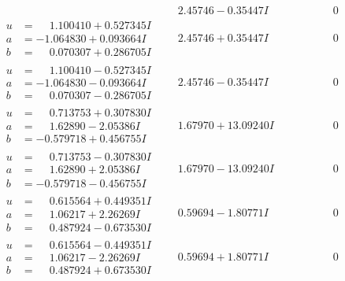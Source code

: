 \documentclass[1p]{elsarticle_modified}
\theoremstyle{definition}
\begin{document}
$$\begin{array}{c|c|c}
 & \phantom{-}2.45746 - 0.35447 I & \phantom{-0.000000 } 0 \\ \hline\begin{aligned}
u &= \phantom{-}1.100410 + 0.527345 I \\
a &= -1.064830 + 0.093664 I \\
b &= \phantom{-}0.070307 + 0.286705 I\end{aligned}
 & \phantom{-}2.45746 + 0.35447 I & \phantom{-0.000000 } 0 \\ \hline\begin{aligned}
u &= \phantom{-}1.100410 - 0.527345 I \\
a &= -1.064830 - 0.093664 I \\
b &= \phantom{-}0.070307 - 0.286705 I\end{aligned}
 & \phantom{-}2.45746 - 0.35447 I & \phantom{-0.000000 } 0 \\ \hline\begin{aligned}
u &= \phantom{-}0.713753 + 0.307830 I \\
a &= \phantom{-}1.62890 - 2.05386 I \\
b &= -0.579718 + 0.456755 I\end{aligned}
 & \phantom{-}1.67970 + 13.09240 I & \phantom{-0.000000 } 0 \\ \hline\begin{aligned}
u &= \phantom{-}0.713753 - 0.307830 I \\
a &= \phantom{-}1.62890 + 2.05386 I \\
b &= -0.579718 - 0.456755 I\end{aligned}
 & \phantom{-}1.67970 - 13.09240 I & \phantom{-0.000000 } 0 \\ \hline\begin{aligned}
u &= \phantom{-}0.615564 + 0.449351 I \\
a &= \phantom{-}1.06217 + 2.26269 I \\
b &= \phantom{-}0.487924 - 0.673530 I\end{aligned}
 & \phantom{-}0.59694 - 1.80771 I & \phantom{-0.000000 } 0 \\ \hline\begin{aligned}
u &= \phantom{-}0.615564 - 0.449351 I \\
a &= \phantom{-}1.06217 - 2.26269 I \\
b &= \phantom{-}0.487924 + 0.673530 I\end{aligned}
 & \phantom{-}0.59694 + 1.80771 I & \phantom{-0.000000 } 0 \\ \hline\begin{aligned}

\end{aligned}
\end{array}$$
\end{document}

